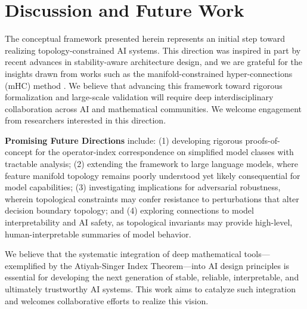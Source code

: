 \documentclass[10pt,leqno]{amsart}
\begin{document}
\section{Discussion and Future Work}
The conceptual framework presented herein represents an initial step toward realizing topology-constrained AI systems. This direction was inspired in part by recent advances in stability-aware architecture design, and we are grateful for the insights drawn from works such as the manifold-constrained hyper-connections (mHC) method \cite{deepseek2025mhc}. We believe that advancing this framework toward rigorous formalization and large-scale validation will require deep interdisciplinary collaboration across AI and mathematical communities. We welcome engagement from researchers interested in this direction.

\textbf{Promising Future Directions} include: (1) developing rigorous proofs-of-concept for the operator-index correspondence on simplified model classes with tractable analysis; (2) extending the framework to large language models, where feature manifold topology remains poorly understood yet likely consequential for model capabilities; (3) investigating implications for adversarial robustness, wherein topological constraints may confer resistance to perturbations that alter decision boundary topology; and (4) exploring connections to model interpretability and AI safety, as topological invariants may provide high-level, human-interpretable summaries of model behavior.

We believe that the systematic integration of deep mathematical tools---exemplified by the Atiyah-Singer Index Theorem---into AI design principles is essential for developing the next generation of stable, reliable, interpretable, and ultimately trustworthy AI systems. This work aims to catalyze such integration and welcomes collaborative efforts to realize this vision.
\end{document}
